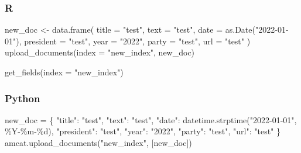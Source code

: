\documentclass[
  letterpaper,
  DIV=11,
  numbers=noendperiod]{scrreprt}
\newenvironment{Shaded}{\begin{snugshade}}{\end{snugshade}}
\newcommand{\AttributeTok}[1]{\textcolor[rgb]{0.40,0.45,0.13}{#1}}
\newcommand{\FunctionTok}[1]{\textcolor[rgb]{0.28,0.35,0.67}{#1}}
\newcommand{\NormalTok}[1]{\textcolor[rgb]{0.00,0.23,0.31}{#1}}
\newcommand{\OperatorTok}[1]{\textcolor[rgb]{0.37,0.37,0.37}{#1}}
\newcommand{\OtherTok}[1]{\textcolor[rgb]{0.00,0.23,0.31}{#1}}
\newcommand{\SpecialCharTok}[1]{\textcolor[rgb]{0.37,0.37,0.37}{#1}}
\newcommand{\StringTok}[1]{\textcolor[rgb]{0.13,0.47,0.30}{#1}}
\begin{document}
\subsubsection{R}

\begin{Shaded}
\begin{Highlighting}[]
\NormalTok{new\_doc }\OtherTok{\textless{}{-}} \FunctionTok{data.frame}\NormalTok{(}
  \AttributeTok{title =} \StringTok{"test"}\NormalTok{,}
  \AttributeTok{text =} \StringTok{"test"}\NormalTok{,}
  \AttributeTok{date =} \FunctionTok{as.Date}\NormalTok{(}\StringTok{"2022{-}01{-}01"}\NormalTok{),}
  \AttributeTok{president =} \StringTok{"test"}\NormalTok{,}
  \AttributeTok{year =} \StringTok{"2022"}\NormalTok{,}
  \AttributeTok{party =} \StringTok{"test"}\NormalTok{,}
  \AttributeTok{url =} \StringTok{"test"}
\NormalTok{)}
\FunctionTok{upload\_documents}\NormalTok{(}\AttributeTok{index =} \StringTok{"new\_index"}\NormalTok{, new\_doc)}
\end{Highlighting}
\end{Shaded}

\begin{Shaded}
\begin{Highlighting}[]
\FunctionTok{get\_fields}\NormalTok{(}\AttributeTok{index =} \StringTok{"new\_index"}\NormalTok{)}
\end{Highlighting}
\end{Shaded}

\subsubsection{Python}

\begin{Shaded}
\begin{Highlighting}[]
\NormalTok{new\_doc }\OperatorTok{=}\NormalTok{ \{}
  \StringTok{"title"}\NormalTok{: }\StringTok{"test"}\NormalTok{,}
  \StringTok{"text"}\NormalTok{: }\StringTok{"test"}\NormalTok{,}
  \StringTok{"date"}\NormalTok{: datetime.strptime(}\StringTok{"2022{-}01{-}01"}\NormalTok{, }\StringTok{\textquotesingle{}\%Y{-}\%m{-}}\SpecialCharTok{\%d}\StringTok{\textquotesingle{}}\NormalTok{),}
  \StringTok{"president"}\NormalTok{: }\StringTok{"test"}\NormalTok{,}
  \StringTok{"year"}\NormalTok{: }\StringTok{"2022"}\NormalTok{,}
  \StringTok{"party"}\NormalTok{: }\StringTok{"test"}\NormalTok{,}
  \StringTok{"url"}\NormalTok{: }\StringTok{"test"}
\NormalTok{\}}
\NormalTok{amcat.upload\_documents(}\StringTok{"new\_index"}\NormalTok{, [new\_doc])}
\end{Highlighting}
\end{Shaded}
\end{document}
